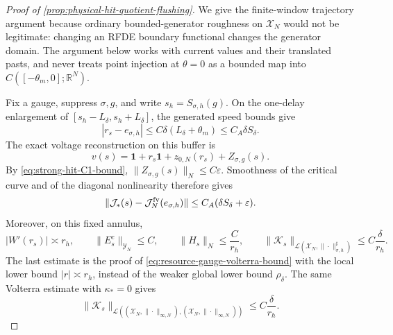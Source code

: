 \begin{proof}[Proof of
\cref{prop:physical-hit-quotient-flushing}]
We give the finite-window trajectory argument because ordinary
bounded-generator roughness on \(\mathscr X_N\) would not be legitimate:
changing an RFDE boundary functional changes the generator domain.  The
argument below works with current values and their translated pasts, and
never treats point injection at \(\theta=0\) as a bounded map into
\(C([-\theta_m,0];\mathbb R^N)\).

Fix a gauge, suppress \(\sigma,g\), and write \(s_h=S_{\sigma,h}(g)\).
On the one-delay enlargement of
\([s_h-L_\delta,s_h+L_\delta]\), the generated speed bounds give
\begin{equation}
 |r_s-e_{\sigma,h}|
 \le C\delta(L_\delta+\theta_m)
 \le C_A\delta S_\delta.                          \label{eq:proof-hit-local-r-geometry}
\end{equation}
The exact voltage reconstruction on this buffer is
\[
 v(s)=\mathbf1+r_s\mathbf1+z_{0,N}(r_s)+Z_{\sigma,g}(s).
\]
By \cref{eq:strong-hit-C1-bound},
\(\|Z_{\sigma,g}(s)\|_N\le C\varepsilon\).  Smoothness of the
critical curve and of the diagonal nonlinearity therefore gives
\begin{equation}
 \|\mathcal J_*(s)
       -\mathcal J_N^{\rm fv}(e_{\sigma,h})\|
 \le C_A(\delta S_\delta+\varepsilon).            \label{eq:proof-hit-current-coefficient-difference}
\end{equation}
Moreover, on this fixed annulus,
\begin{equation}
 |W'(r_s)|\asymp r_h,\qquad
 \|E_s^c\|_{\mathscr Y_N}\le C,\qquad
 \|H_s\|_N\le\frac C{r_h},\qquad
 \|\mathcal K_s\|_{\mathcal L(
       \mathscr X_N,\|\cdot\|_{\sigma,h}^{\sharp})}
 \le C\frac{\delta}{r_h}.                         \label{eq:proof-hit-resource-coordinate-bounds}
\end{equation}
The last estimate is the proof of
\cref{eq:resource-gauge-volterra-bound} with the local lower bound
\(|r|\asymp r_h\), instead of the weaker global lower bound
\(\rho_\delta\).  The same Volterra estimate with \(\kappa_*=0\) gives
\begin{equation}
 \|\mathcal K_s\|_{\mathcal L(
       (\mathscr X_N,\|\cdot\|_{\infty,N}),
       (\mathscr X_N,\|\cdot\|_{\infty,N}))}
 \le C\frac{\delta}{r_h}.                         \label{eq:proof-hit-volterra-C0-bound}
\end{equation}


\end{proof}

